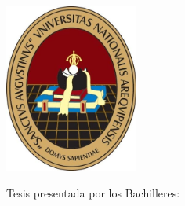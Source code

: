 \begin{titlepage}
    {
    
    \begin{center}
        {\fontsize{14}{14}\selectfont\bfseries
        \VarInstitucion \par}
        
        {\fontsize{12}{12}\selectfont\bfseries 
        \VarFacultad \par
        \VarEscuela \par}
        
        \vfill\vspace{0.3cm}
        
        \includegraphics[width=0.33\textwidth]{assets/cover-page/UNSA logo.jpg}
        
        \vfill\vspace{0.3cm}
        
        
        {\fontsize{14}{16}\selectfont{
        \VarTituloTesis
        }\par}
    \end{center}
    }
    
    \vfill\vspace{0.3cm}\par
    
    {
    \fontsize{12}{12}\selectfont
    
    \begin{adjustwidth}{0.52\textwidth}{} %
        
        
        {
        \noindent Tesis presentada por los Bachilleres:\par
        \noindent \VarAutorUno \par
        \noindent \VarAutorDos \par
        }
        

\end{adjustwidth}}
\end{titlepage}
